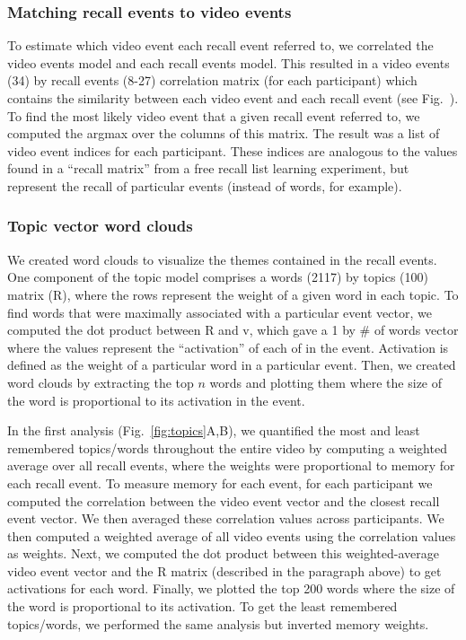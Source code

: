 

\subsubsection*{Matching recall events to video events}


To estimate which video event each recall event referred to, we correlated the video events model and each recall events model. This resulted in a video events (34) by recall events (8-27) correlation matrix (for each participant) which contains the similarity between each video event and each recall event (see Fig.~\matchmats).  To find the most likely video event that a given recall event referred to, we computed the argmax over the columns of this matrix.  The result was a list of video event indices for each participant. These indices are analogous to the values found in a ``recall matrix'' from a free recall list learning experiment, but represent the recall of particular events (instead of words, for example).

\subsubsection*{Topic vector word clouds}
We created word clouds to visualize the themes contained in the recall events. One component of the topic model comprises a words (2117) by topics (100) matrix (R), where the rows represent the weight of a given word in each topic.  To find words that were maximally associated with a particular event vector, we computed the dot product between R and v, which gave a 1 by \# of words vector where the values represent the ``activation'' of each of in the event. Activation is defined as the weight of a particular word in a particular event. Then, we created word clouds by extracting the top $n$ words and plotting them where the size of the word is proportional to its activation in the event.

In the first analysis (Fig.~\ref{fig:topics}A,B), we quantified the most and least remembered topics/words throughout the entire video by computing a weighted average over all recall events, where the weights were proportional to memory for each recall event. To measure memory for each event, for each participant we computed the correlation between the video event vector and the closest recall event vector. We then averaged these correlation values across participants. We then computed a weighted average of all video events using the correlation values as weights. Next, we computed the dot product between this weighted-average video event vector and the R matrix (described in the paragraph above) to get activations for each word. Finally, we plotted the top 200 words where the size of the word is proportional to its activation. To get the least remembered topics/words, we performed the same analysis but inverted memory weights.

